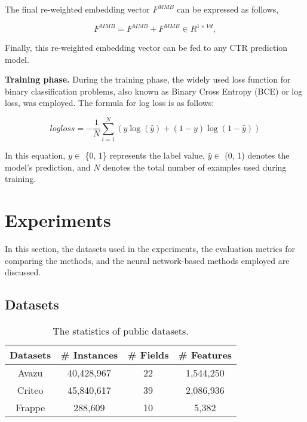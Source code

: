 \documentclass{article}
\begin{document}
\noindent The final re-weighted embedding vector ${F}^{MMB}$ can be expressed as follows,

\begin{equation}
{F}^{MMB} = {F}^{MMB} + {F}^{MMB} \in R^{1\times Vd},
\end{equation}

\noindent Finally, this re-weighted embedding vector can be fed to any CTR prediction model.

\noindent\textbf{Training phase.} During the training phase, the widely used loss function for binary classification problems, also known as Binary Cross Entropy (BCE) or log loss, was employed. The formula for log loss is as follows:

\begin{equation}
log loss = -\frac{1}{N}\sum^{N}_{i=1}{(y\log(\hat{y}) + (1 - y)\log(1 - \hat{y}))}
\end{equation}

In this equation, $y\in$ \{0, 1\} represents the label value, $\hat{y} \in$ (0, 1) denotes the model's prediction, and $N$ denotes the total number of examples used during training.



\section{Experiments}

In this section, the datasets used in the experiments, the evaluation metrics for comparing the methods, and the neural network-based methods employed are discussed. 


\subsection{Datasets}


\begin{table}[tbh]
\caption{The statistics of public datasets.}
\label{table:datasets}
\begin{center}
\begin{tabular}{|c c c c|} 
\hline
 Datasets & \# Instances & \# Fields & \# Features\\ [0.5ex] 
 \hline \hline
 Avazu & 40,428,967 & 22 & 1,544,250 \\
 \hline
  Criteo & 45,840,617 & 39 & 2,086,936 \\
 \hline
 Frappe & 288,609 & 10 & 5,382 \\  [0.25ex]   
 \hline
\end{tabular}
\end{center}
\end{table}
\end{document}
